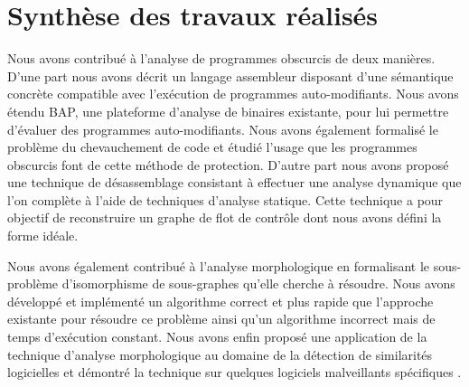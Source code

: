 \section*{Synthèse des travaux réalisés}

Nous avons contribué à l’analyse de programmes obscurcis de deux manières. 
D’une part nous avons décrit un langage assembleur disposant d’une sémantique concrète compatible avec l’exécution de programmes auto-modifiants.
Nous avons étendu BAP, une plateforme d’analyse de binaires existante, pour lui permettre d’évaluer des programmes auto-modifiants.
Nous avons également formalisé le problème du chevauchement de code et étudié l’usage que les programmes obscurcis font de cette méthode de protection. 
D’autre part nous avons proposé une technique de désassemblage consistant à effectuer une analyse dynamique que l’on complète à l’aide de techniques d’analyse statique. 
Cette technique a pour objectif de reconstruire un graphe de flot de contrôle dont nous avons défini la forme idéale.

Nous avons également contribué à l’analyse morphologique en formalisant le sous-problème d’isomorphisme de sous-graphes qu’elle cherche à résoudre. Nous avons développé et implémenté un algorithme correct et plus rapide que l'approche existante pour résoudre ce problème ainsi qu’un algorithme incorrect mais de temps d’exécution constant. Nous avons enfin proposé une application de la technique d’analyse morphologique au domaine de la détection de similarités logicielles \cite{REAT12,mal12} et démontré la technique sur quelques logiciels malveillants spécifiques \cite{sstic13,mal13}.

